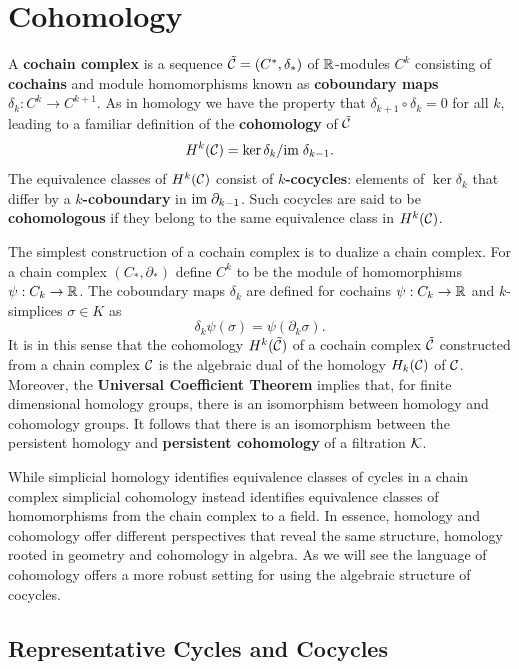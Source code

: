 \section{Cohomology} %
\label{sec:cohomology}

A \textbf{cochain complex} is a sequence $\tilde{\mathcal{C}} = (C^*, \delta_*)$ of $\mathbb{R}$-modules $C^k$ consisting of \textbf{cochains} and module homomorphisms known as \textbf{coboundary maps} $\delta_k:C^k\to C^{k+1}$.
As in homology we have the property that $\delta_{k+1}\circ\delta_k = 0$ for all $k$, leading to a familiar definition of the \textbf{cohomology} of $\tilde{\mathcal{C}}$
\[ H^k(\mathcal{C}) = \ker\delta_k/\mathrm{im}\;\delta_{k-1}.\]
The equivalence classes of $H^k(\mathcal{C})$ consist of \textbf{$k$-cocycles}: elements of $\ker\delta_k$ that differ by a \textbf{$k$-coboundary} in $\mathrm{im}\;\partial_{k-1}$.
Such cocycles are said to be \textbf{cohomologous} if they belong to the same equivalence class in $H^k(\mathcal{C})$.

The simplest construction of a cochain complex is to dualize a chain complex.
For a chain complex $(C_*,\partial_*)$ define $C^k$ to be the module of homomorphisms $\psi:C_k\to\mathbb{R}$.
The coboundary maps $\delta_k$ are defined for cochains $\psi:C_k\to\mathbb{R}$ and $k$-simplices $\sigma\in K$ as
\[\delta_k\psi(\sigma) = \psi(\partial_k\sigma).\]
It is in this sense that the cohomology $H^k(\tilde{\mathcal{C}})$ of a cochain complex $\tilde{\mathcal{C}}$ constructed from a chain complex $\mathcal{C}$ is the algebraic dual of the homology $H_k(\mathcal{C})$ of $\mathcal{C}$.
Moreover, the \textbf{Universal Coefficient Theorem} implies that, for finite dimensional homology groups, there is an isomorphism between homology and cohomology groups.
It follows that there is an isomorphism between the persistent homology and \textbf{persistent cohomology} of a filtration ${\mathcal{K}}$.

While simplicial homology identifies equivalence classes of cycles in a chain complex simplicial cohomology instead identifies equivalence classes of homomorphisms from the chain complex to a field.
In essence, homology and cohomology offer different perspectives that reveal the same structure, homology rooted in geometry and cohomology in algebra.
As we will see the language of cohomology offers a more robust setting for using the algebraic structure of cocycles.

\subsection{Representative Cycles and Cocycles}

